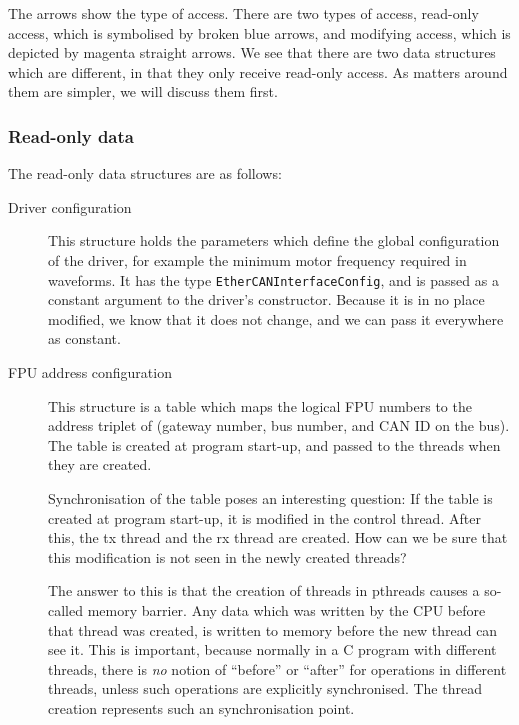\documentclass[fontsize=12,a4paper]{scrartcl}
\begin{document}
The arrows show the type of access. There are two types of access,
read-only access, which is symbolised by broken blue arrows, and
modifying access, which is depicted by magenta straight arrows. We see
that there are two data structures which are different, in that they
only receive read-only access. As matters around them are simpler, we
will discuss them first.

\subsubsection{Read-only data}

The read-only data structures are as follows:

\begin{description}
\item[Driver configuration] This structure holds the parameters which
  define the global configuration of the driver, for example the
  minimum motor frequency required in waveforms. It has the type
  \texttt{EtherCANInterfaceConfig}, and is passed as a constant
  argument to the driver's constructor. Because it is in no place
  modified, we know that it does not change, and we can pass it
  everywhere as constant.

\item[FPU address configuration] This structure is a table which maps
  the logical FPU numbers to the address triplet of (gateway number,
  bus number, and CAN ID on the bus). The table is created at program
  start-up, and passed to the threads when they are created.

  Synchronisation of the table poses an interesting question: If the
  table is created at program start-up, it is modified in the control
  thread. After this, the tx thread and the rx thread are created. How
  can we be sure that this modification is not seen in the newly
  created threads?

  The answer to this is that the creation of threads in pthreads
  causes a so-called memory barrier. Any data which was written by the
  CPU before that thread was created, is written to memory before the
  new thread can see it. This is important, because normally in a C
  program with different threads, there is \emph{no} notion of
  ``before'' or ``after'' for operations in different threads, unless
  such operations are explicitly synchronised. The thread creation
  represents such an synchronisation point.



\end{description}
\end{document}
